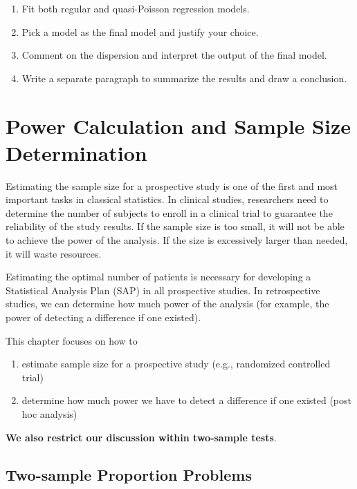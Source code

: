 \documentclass[
]{book}
\begin{document}
\begin{enumerate}
\def\labelenumi{\arabic{enumi}.}
\item
  Fit both regular and quasi-Poisson regression models.
\item
  Pick a model as the final model and justify your choice.
\item
  Comment on the dispersion and interpret the output of the final model.
\item
  Write a separate paragraph to summarize the results and draw a conclusion.
\end{enumerate}

\hypertarget{power-calculation-and-sample-size-determination}{%
\chapter{Power Calculation and Sample Size Determination}\label{power-calculation-and-sample-size-determination}}

Estimating the sample size for a prospective study is one of the first and most important tasks in classical statistics. In clinical studies, researchers need to determine the number of subjects to enroll in a clinical trial to guarantee the reliability of the study results. If the sample size is too small, it will not be able to achieve the power of the analysis. If the size is excessively larger than needed, it will waste resources.

Estimating the optimal number of patients is necessary for developing a Statistical Analysis Plan (SAP) in all prospective studies. In retrospective studies, we can determine how much power of the analysis (for example, the power of detecting a difference if one existed).

This chapter focuses on how to

\begin{enumerate}
\def\labelenumi{\arabic{enumi})}
\item
  estimate sample size for a prospective study (e.g., randomized controlled trial)
\item
  determine how much power we have to detect a difference if one existed (post hoc analysis)
\end{enumerate}

\textbf{\color{red}We also restrict our discussion within two-sample tests}.

\hypertarget{two-sample-proportion-problems}{%
\section{Two-sample Proportion Problems}\label{two-sample-proportion-problems}}
\end{document}
